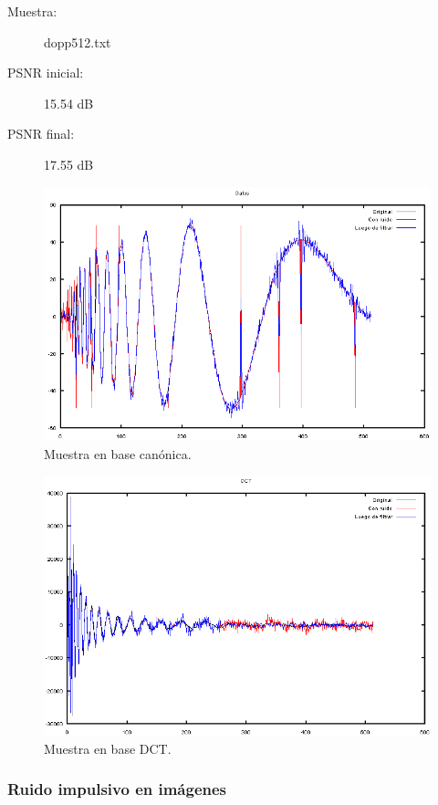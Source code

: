 \documentclass[a4paper,10pt,twoside]{article}
\begin{document}
\begin{description}
  \item[Muestra:] dopp512.txt
  \item[PSNR inicial:] 15.54 dB
  \item[PSNR final:] 17.55 dB
\end{description}

\begin{figure}[H]
  \centering
  \includegraphics[width=15cm]{graficos/dopp_impulsivo_atenuar_muestra.png} 
  \caption{Muestra en base canónica.}
\end{figure}

\begin{figure}[H]
  \centering
  \includegraphics[width=15cm]{graficos/dopp_impulsivo_atenuar_dct.png} 
  \caption{Muestra en base DCT.}
\end{figure}


\subsubsection{Ruido impulsivo en imágenes}
\end{document}
